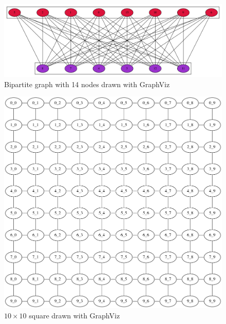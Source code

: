 \documentclass[11pt]{article}
\numberwithin{figure}{section}
\begin{document}
\begin{figure}[ht]
	\centering
		\includegraphics[width=6in]{bipartite.png}
	\caption{Bipartite graph with 14 nodes drawn with GraphViz}
	\label{fig:bipartite}
\end{figure}
\begin{figure}[ht]
	\centering
		\includegraphics[width=6in]{square.png}
	\caption{$10 \times 10$ square drawn with GraphViz}
	\label{fig:square}
\end{figure}
\end{document}
